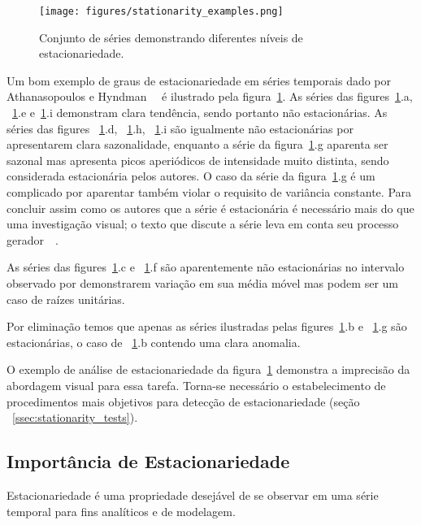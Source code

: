 \begin{figure}[h]
    \centering
    \texttt{[image: figures/stationarity\_examples.png]}
    \caption{Conjunto de séries demonstrando diferentes níveis de
    estacionariedade.}
    \label{fig:stationarity}
\end{figure}

Um bom exemplo de graus de estacionariedade em séries temporais dado por
Athanasopoulos e Hyndman~~\cite{athana} é ilustrado pela
figura~\ref{fig:stationarity}. As séries das figures~\ref{fig:stationarity}.a,
~\ref{fig:stationarity}.e e~\ref{fig:stationarity}.i demonstram clara
tendência, sendo portanto não estacionárias. As séries das figures
~\ref{fig:stationarity}.d, ~\ref{fig:stationarity}.h, ~\ref{fig:stationarity}.i
são igualmente não estacionárias por apresentarem clara sazonalidade, enquanto
a série da figura~\ref{fig:stationarity}.g aparenta ser sazonal mas apresenta
picos aperiódicos de intensidade muito distinta, sendo considerada estacionária
pelos autores. O caso da série da figura~\ref{fig:stationarity}.g é um
complicado por aparentar também violar o requisito de variância constante. Para
concluir assim como os autores que a série é estacionária é necessário mais do
que uma investigação visual; o texto que discute a série leva em conta seu
processo gerador~~\cite{athana}.

As séries das figures~\ref{fig:stationarity}.c e ~\ref{fig:stationarity}.f são
aparentemente não estacionárias no intervalo observado por demonstrarem
variação em sua média móvel mas podem ser um caso de raízes unitárias.

Por eliminação temos que apenas as séries ilustradas pelas
figures~\ref{fig:stationarity}.b e ~\ref{fig:stationarity}.g são estacionárias,
o caso de ~\ref{fig:stationarity}.b contendo uma clara anomalia.

O exemplo de análise de estacionariedade da figura~\ref{fig:stationarity}
demonstra a imprecisão da abordagem visual para essa tarefa. Torna-se
necessário o estabelecimento de procedimentos mais objetivos para detecção de
estacionariedade (seção ~\ref{ssec:stationarity_tests}).

\subsection{Importância de Estacionariedade}

Estacionariedade é uma propriedade desejável de se observar em uma série
temporal para fins analíticos e de modelagem.

